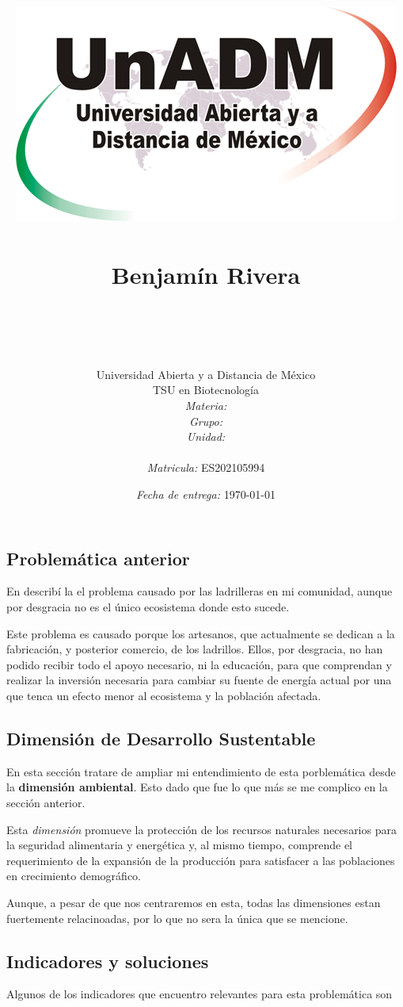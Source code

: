 \documentclass[12pt]{article}
\title{
	\includegraphics{../../../assets/logo-unadm} \\
	\ \\ Benjam\'in Rivera \\
	\bf{\titulo}\\\ \\}
\author{
	Universidad Abierta y a Distancia de México \\
	TSU en Biotecnolog\'ia \\
	\textit{Materia:} \materia \\
	\textit{Grupo:} \grupo \\
	\textit{Unidad:} \unidad \\
	\\
	\textit{Matricula:} ES202105994 }
\date{\textit{Fecha de entrega:} \today}
\begin{document}
\maketitle\newpage

\subsection*{Problem\'atica anterior}

	\par En \cite{unidad1} describ\'i la el problema causado por las ladrilleras en mi comunidad, aunque por desgracia no es el \'unico ecosistema donde esto sucede.
	\par Este problema es causado porque los artesanos, que actualmente se dedican a la fabricación, y posterior comercio, de los ladrillos. Ellos, por desgracia, no han podido recibir todo el apoyo necesario, ni la educación, para que comprendan y realizar la inversión necesaria para cambiar su fuente de energía actual por una que tenca un efecto menor al ecosistema y la población afectada.



\subsection*{Dimensi\'on de Desarrollo Sustentable}
	
	\par En esta secci\'on tratare de ampliar mi entendimiento de esta porblem\'atica desde la \textbf{dimensi\'on ambiental}. Esto dado que fue lo que m\'as se me complico en la secci\'on anterior.
	\par Esta \textit{dimensi\'on} promueve la protección de los recursos naturales necesarios para la seguridad alimentaria y energética y, al mismo tiempo, comprende el requerimiento de la expansión de la producción para satisfacer a las poblaciones en crecimiento demográfico.
	\par Aunque, a pesar de que nos centraremos en esta, todas las dimensiones estan fuertemente relacinoadas, por lo que no sera la \'unica que se mencione.



\subsection*{Indicadores y soluciones}

	\par Algunos de los indicadores que encuentro relevantes para esta problem\'atica son
	
\end{document}
